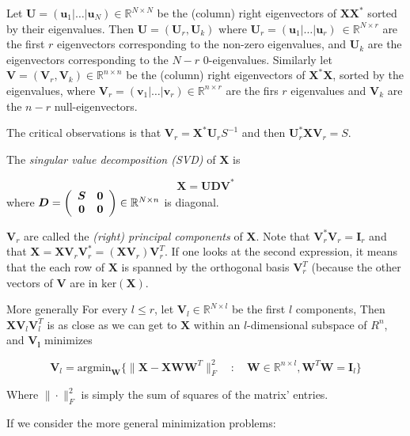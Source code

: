 \documentclass[11pt, a4paper]{report}
\theoremstyle{plain}
\theoremstyle{definition}
\theoremstyle{remark}
\newcommand{\R}{\mathbb{R}}
\newcommand{\X}{\mathbf{X}}
\newcommand{\W}{\mathbf{W}}
\newcommand{\bv}[1]{\boldsymbol{#1}}
\begin{document}
Let $\bv{U} = (\bv{u}_1 | \dots | \bv{u}_N) \in \R^{N \times N}$ be the (column)
right eigenvectors of $\X \X^*$ sorted by their eigenvalues. Then $\bv{U} =
(\bv{U}_r, \bv{U}_k)$ where $\bv{U}_r = (\bv{u}_1 | \dots | \bv{u}_r) \ \in
\R^{N \times r}$ are the first $r$ eigenvectors corresponding to the non-zero
eigenvalues, and $\bv{U}_k$ are the eigenvectors corresponding to the $N-r$
$0$-eigenvalues. Similarly let $\bv{V}  = (\bv{V}_r, \bv{V}_k)\in \R^{n \times
n}$ be the (column) right eigenvectors of $\X^* \X$, sorted by the eigenvalues,
where $\bv{V}_r  = (\bv{v}_1 | \dots | \bv{v}_r) \in \R^{n \times r}$ are the
firs $r$ eigenvalues and $\bv{V}_k$ are the $n-r$ null-eigenvectors.

The critical observations is that $\bv{V}_r = \bv{X}^* \bv{U}_r S^{-1}$ and then
$\bv{U}_r^* \X \bv{V}_r = S$.

The \textit{singular value decomposition (SVD)} of $\X$ is 

\begin{equation}
\label{eq:svd}
\X = \bv{U} \bv{D} \bv{V}^*
\end{equation}
where 
$\bv{D} =
\left(
\begin{array}{c c}
\bv{S} & \bv{0} \\
\bv{0} & \bv{0}
\end{array}
\right) \in \R^{N \times n}
$ is diagonal.

$\bv{V}_r$ are called the \textit{(right) principal components} of $\X$.
Note that $\bv{V}_r^* \bv{V}_r = \bv{I}_r$ and that 
$\X = \X \bv{V}_r \bv{V}_r^* = (\X \bv{V}_r) \bv{V}_r^T$. If one looks at the second expression, 
it means that the each row of $\X$ is spanned by the orthogonal
basis $\bv{V}_r^T$ (because the other vectors of $\bv{V}$ are in $\text{ker}(\X)$.

More generally
For every $l \leq r$, let $\bv{V}_l \in \R^{N \times l}$ be the first $l$ components,
Then $\X\bv{V}_l \bv{V}_l^T$ is as close as we can get to $\X$ within an
$l$-dimensional subspace of $R^n$, and $\bv{V_l}$ minimizes

\begin{equation}
\label{eqn:pca}
\bv{V}_l = \text{argmin}_{\W} \{
\|\X - \X \bv{W}\bv{W}^T\|_F^2 \quad : \quad \bv{W} \in \R^{n \times l}, \bv{W}^T \bv{W} =
\bv{I}_l\}
\end{equation} 

Where $\| \cdot \|_F^2$ is simply the sum of squares of the matrix' entries.

If we consider the more general minimization problems: 
\end{document}
